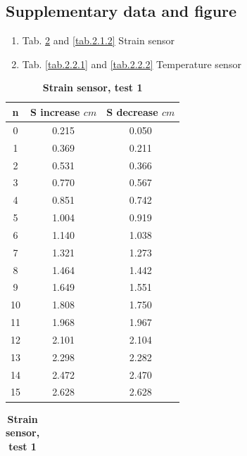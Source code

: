 \documentclass[12pt,a4paper,UTF8]{article}
\begin{document}
    \subsection{Supplementary data and figure}
    \begin{enumerate}[label=\arabic*.]
        \item Tab. \ref{tab.2.1.1} and \ref{tab.2.1.2} Strain sensor
        \item Tab. \ref{tab.2.2.1} and \ref{tab.2.2.2} Temperature sensor
    \end{enumerate}
    \begin{table}[htbp]
		\begin{minipage}{0.5\textwidth}
            \centering
            \begin{tabular}{ccc}
                \toprule
                n & S increase $cm$ & S decrease $cm$ \\
                \midrule               
                0 & 0.215 & 0.050 \\
                1 & 0.369 & 0.211 \\
                2 & 0.531 & 0.366 \\
                3 & 0.770 & 0.567 \\
                4 & 0.851 & 0.742 \\
                5 & 1.004 & 0.919 \\
                6 & 1.140 & 1.038 \\
                7 & 1.321 & 1.273 \\
                8 & 1.464 & 1.442 \\
                9 & 1.649 & 1.551 \\
                10 & 1.808 & 1.750 \\
                11 & 1.968 & 1.967 \\
                12 & 2.101 & 2.104 \\
                13 & 2.298 & 2.282 \\
                14 & 2.472 & 2.470 \\
                15 & 2.628 & 2.628 \\
                \bottomrule
            \end{tabular}
            \caption{\textbf{Strain sensor, test 1}}
            \label{tab.2.1.1}
		\end{minipage}
		\begin{minipage}{0.5\textwidth}
            \centering
            \begin{tabular}{ccc}

\end{tabular}
\end{minipage}
\end{table}
\end{document}
